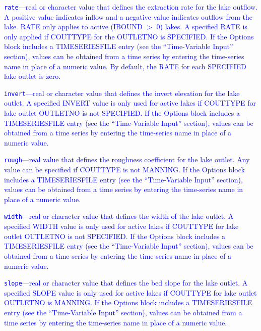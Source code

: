 \begin{description}
\item \textcolor{blue}{\texttt{rate}---real or character value that defines the extraction rate for the lake outflow. A positive value indicates inflow and a negative value indicates outflow from the lake. RATE only applies to active (IBOUND $>$ 0) lakes. A specified RATE is only applied if COUTTYPE for the OUTLETNO is SPECIFIED. If the Options block includes a TIMESERIESFILE entry (see the ``Time-Variable Input'' section), values can be obtained from a time series by entering the time-series name in place of a numeric value. By default, the RATE for each SPECIFIED lake outlet is zero.}

\item \textcolor{blue}{\texttt{invert}---real or character value that defines the invert elevation for the lake outlet. A specified INVERT value is only used for active lakes if COUTTYPE for lake outlet OUTLETNO is not SPECIFIED. If the Options block includes a TIMESERIESFILE entry (see the ``Time-Variable Input'' section), values can be obtained from a time series by entering the time-series name in place of a numeric value.}

\item \textcolor{blue}{\texttt{rough}---real value that defines the roughness coefficient for the lake outlet. Any value can be specified if COUTTYPE is not MANNING. If the Options block includes a TIMESERIESFILE entry (see the ``Time-Variable Input'' section), values can be obtained from a time series by entering the time-series name in place of a numeric value.}

\item \textcolor{blue}{\texttt{width}---real or character value that defines the width of the lake outlet. A specified WIDTH value is only used for active lakes if COUTTYPE for lake outlet OUTLETNO is not SPECIFIED. If the Options block includes a TIMESERIESFILE entry (see the ``Time-Variable Input'' section), values can be obtained from a time series by entering the time-series name in place of a numeric value.}

\item \textcolor{blue}{\texttt{slope}---real or character value that defines the bed slope for the lake outlet. A specified SLOPE value is only used for active lakes if COUTTYPE for lake outlet OUTLETNO is MANNING. If the Options block includes a TIMESERIESFILE entry (see the ``Time-Variable Input'' section), values can be obtained from a time series by entering the time-series name in place of a numeric value.}


\end{description}
